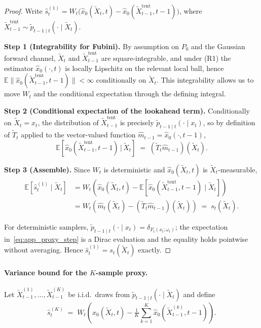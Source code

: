 \documentclass{article}
\theoremstyle{plain}
\theoremstyle{definition}
\theoremstyle{remark}
\begin{document}
\begin{proof}
Write
\(\hat s_t^{(1)} = W_t\bigl(\hat x_0(\tilde X_t,t) - \hat x_0(\tilde
X_{t-1}^{\mathrm{tent}},t-1)\bigr)\), where
\(\tilde X_{t-1}^{\mathrm{tent}} \sim \tilde p_{t-1\mid t}(\cdot \mid
\tilde X_t)\).

\textbf{Step 1 (Integrability for Fubini).}
By assumption on \(P_0\) and the Gaussian forward channel, \(\tilde X_t\)
and \(\tilde X_{t-1}^{\mathrm{tent}}\) are square-integrable, and under
(R1) the estimator \(\hat x_0(\cdot,t)\) is locally Lipschitz on the
relevant local ball, hence
\(\mathbb{E}\|\hat x_0(\tilde X_{t-1}^{\mathrm{tent}},t-1)\| < \infty\)
conditionally on \(\tilde X_t\). This integrability allows us to move
\(W_t\) and the conditional expectation through the defining integral.

\textbf{Step 2 (Conditional expectation of the lookahead term).}
Conditionally on \(\tilde X_t = x_t\), the distribution of \(\tilde
X_{t-1}^{\mathrm{tent}}\) is precisely \(\tilde p_{t-1\mid t}(\cdot\mid
x_t)\), so by definition of \(\tilde T_t\) applied to the vector-valued
function \(\hat m_{t-1} = \hat x_0(\cdot,t-1)\),
\begin{equation}
\mathbb{E}\!\left[\hat x_0(\tilde X_{t-1}^{\mathrm{tent}}, t-1)
  \,\big|\,\tilde X_t\right]
\;=\; (\tilde T_t \hat m_{t-1})(\tilde X_t).
\label{eq:app_proxy_step}
\end{equation}

\textbf{Step 3 (Assemble).}
Since \(W_t\) is deterministic and \(\hat x_0(\tilde X_t, t)\) is
\(\tilde X_t\)-measurable,
\begin{align*}
\mathbb{E}[\hat s_t^{(1)} \mid \tilde X_t]
&= W_t\!\left(\hat x_0(\tilde X_t,t) - \mathbb{E}[\hat x_0(\tilde
    X_{t-1}^{\mathrm{tent}},t-1) \mid \tilde X_t]\right) \\
&= W_t\!\left(\hat m_t(\tilde X_t) - (\tilde T_t\hat m_{t-1})(\tilde X_t)\right)
\;=\; s_t(\tilde X_t).
\end{align*}

For deterministic samplers, \(\tilde p_{t-1\mid t}(\cdot\mid x_t) =
\delta_{F_t(x_t;\omega_t)}\); the expectation in~\eqref{eq:app_proxy_step}
is a Dirac evaluation and the equality holds pointwise without averaging.
Hence \(\hat s_t^{(1)} = s_t(\tilde X_t)\) exactly.
\end{proof}

\paragraph{Variance bound for the \(K\)-sample proxy.}
Let \(\tilde X_{t-1}^{(1)},\dots,\tilde X_{t-1}^{(K)}\) be i.i.d.\ draws from
\(\tilde p_{t-1\mid t}(\cdot\mid\tilde X_t)\) and define
\begin{equation}
\hat s_t^{(K)}
\;=\;
W_t\!\left(\hat x_0(\tilde X_t,t) - \tfrac1K\sum_{k=1}^K \hat x_0(\tilde
X_{t-1}^{(k)},t-1)\right).
\label{eq:app_Ksample}
\end{equation}
\end{document}
